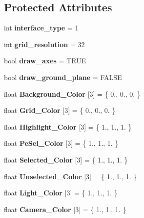 \subsection*{Protected Attributes}
\begin{DoxyCompactItemize}
\item 
\mbox{\label{classpreferences_af1b38ff175740032ff2aefe04b9b8cae}} 
int {\bfseries interface\+\_\+type} = 1
\item 
\mbox{\label{classpreferences_ad80ddea45159b683bfe941857d05b78b}} 
int {\bfseries grid\+\_\+resolution} = 32
\item 
\mbox{\label{classpreferences_a03312cf0d332c39edfdbe73430029634}} 
bool {\bfseries draw\+\_\+axes} = T\+R\+UE
\item 
\mbox{\label{classpreferences_a79576b34baf1fd09c5e9923e668e2c59}} 
bool {\bfseries draw\+\_\+ground\+\_\+plane} = F\+A\+L\+SE
\item 
\mbox{\label{classpreferences_abc0a4ea42c94f872320038818947dbaa}} 
float {\bfseries Background\+\_\+\+Color} \mbox{[}3\mbox{]} = \{ 0., 0., 0. \}
\item 
\mbox{\label{classpreferences_ad9910fda8495cf8308ee5cab48a7621d}} 
float {\bfseries Grid\+\_\+\+Color} \mbox{[}3\mbox{]} = \{ 0., 0., 0. \}
\item 
\mbox{\label{classpreferences_a467b9249314615ffddf9443671c92fae}} 
float {\bfseries Highlight\+\_\+\+Color} \mbox{[}3\mbox{]} = \{ 1., 1., 1. \}
\item 
\mbox{\label{classpreferences_a1f7ffb821d1d4713ffb4a76d1e3cb322}} 
float {\bfseries Pe\+Sel\+\_\+\+Color} \mbox{[}3\mbox{]} = \{ 1., 1., 1. \}
\item 
\mbox{\label{classpreferences_abbb572146585238498f257a6b2428d0d}} 
float {\bfseries Selected\+\_\+\+Color} \mbox{[}3\mbox{]} = \{ 1., 1., 1. \}
\item 
\mbox{\label{classpreferences_a80c1a321a2bc72a2cceca7187b206b9d}} 
float {\bfseries Unselected\+\_\+\+Color} \mbox{[}3\mbox{]} = \{ 1., 1., 1. \}
\item 
\mbox{\label{classpreferences_aef308c504780b24ad1b13b7f8f2a6480}} 
float {\bfseries Light\+\_\+\+Color} \mbox{[}3\mbox{]} = \{ 1., 1., 1. \}
\item 
\mbox{\label{classpreferences_af9d020bef7c3d63de45b02cde80a8087}} 
float {\bfseries Camera\+\_\+\+Color} \mbox{[}3\mbox{]} = \{ 1., 1., 1. \}
\end{DoxyCompactItemize}


